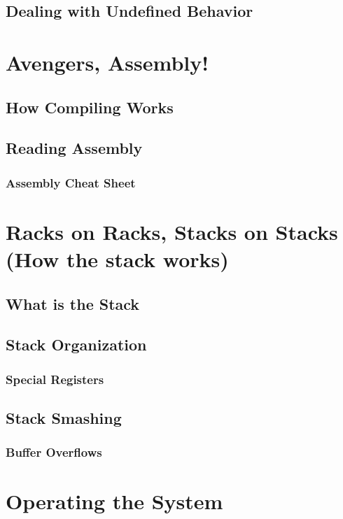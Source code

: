 \documentclass[a4paper, 12pt]{article}
\begin{document}
\subsection{Dealing with Undefined Behavior}

\newpage

\section{Avengers, Assembly!}
\label{sec:assemblystuff}
\subsection{How Compiling Works}
\subsection{Reading Assembly}
\subsubsection{Assembly Cheat Sheet}

\newpage

\section{Racks on Racks, Stacks on Stacks (How the stack works)}
\label{sec:stackstuff}
\subsection{What is the Stack}
\subsection{Stack Organization}
\subsubsection{Special Registers}
\subsection{Stack Smashing}
\subsubsection{Buffer Overflows}

\newpage

\section{Operating the System}
\label{sec:os}
\end{document}
